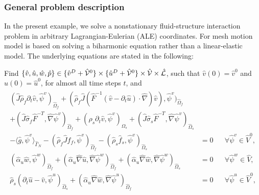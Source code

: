 \subsubsection{General problem description}

In the present example, we solve a 
nonstationary fluid-structure interaction problem in 
arbitrary Lagrangian-Eulerian (ALE) coordinates. 
For mesh motion model is based on solving a biharmonic equation
\cite{Wi11} rather than a linear-elastic model. 
The underlying equations are stated in the following:
\begin{Problem}
  \label{eq:fsi:ale:biharmonic}
  Find $\{\hat v,\hat u,\hat w,\hat p\} \in \{ \hat v^D + \hat {\cal V}^0\} 
\times \{ \hat u^D + \hat {\cal V}^0 \}\times \hat {\cal V} \times \hat {\cal
  L}$, such that $\hat v (0) = \hat v^0$ and $\hat u(0) = \hat u^0$, 
for almost all time steps $t$, and
  \begin{eqnarray*}
    \begin{aligned}
      (\hat J \hat\rho_f \partial_t \hat v,\hat\psi^v)_{\hat\Omega_f}  
      +(\hat\rho_f \hat J  (\hat F^{-1}(\hat
      v-\partial_t \hat u)\cdot\hat\nabla) \hat v),
      \hat\psi^v)_{\hat\Omega_f} &\\
      + (\hat J\hat\sigma_f\hat
      F^{-T},\hat\nabla\hat\psi^v)_{\hat\Omega_f}
      + (\hat\rho_s \partial_t \hat v,\hat\psi^v)_{\Omega_s}  
      + (\hat J\hat\sigma_s\hat F^{-T},\hat\nabla\hat\psi^v)_{\hat\Omega_s}&\\
      - \langle \hat g, \hat\psi^v \rangle_{\hat\Gamma_N} -
      (\hat\rho_f \hat J\hat f_f, \hat\psi^v)_{\hat\Omega_f}
      - (\hat\rho_s\hat f_s, \hat\psi^v)_{\hat\Omega_s}
      &= 0&&\forall\hat\psi^v\in \hat V^0,
      \\
      (\hat\alpha_u\hat w, \hat\psi^w)_{\hat\Omega_f}  + ( \hat\alpha_u\hat\nabla\hat
      u, \hat\nabla\hat\psi^w)_{\hat\Omega_f} +( \hat\alpha_u\hat\nabla\hat
      w, \hat\nabla\hat\psi^w)_{\hat\Omega_s}  
      & = 0 &&\forall\hat\psi^w\in \hat V , \\
      \hat\rho_s (\partial_t\hat u-\hat v,\hat\psi^u)_{\hat\Omega_s}
      + (\hat\alpha_u \hat \nabla \hat w,\hat \nabla\hat\psi^u)_{\hat\Omega_f}
      &=0&&\forall\hat\psi^u\in \hat V^0 ,\\    

\end{aligned}
\end{eqnarray*}
\end{Problem}
